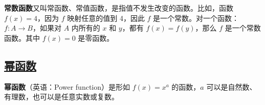 \textbf{常数函数}又叫常函数、常值函数，是指值不发生改变的函数。比如，函数 $f(x) = 4$，因为 $f$ 映射任意的值到 4，因此 $f$ 是一个常数。对一个函数：$f: A \rightarrow B$，如果对 $A$ 内所有的 $x$ 和 $y$，都有 $f(x) = f(y)$，那么 $f$ 是一个常数函数。其中 $f(x) = 0$ 是零函数。

\subsection{\href{https://zh.wikipedia.org/wiki/\%E5\%B9\%82\%E5\%87\%BD\%E6\%95\%B0}{幂函数}}

\textbf{幂函数}（英语：Power function）是形如 $f(x) = x^a$ 的函数，$a$ 可以是自然数、有理数，也可以是任意实数或复数。


